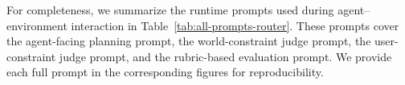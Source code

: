 \documentclass{llmxive}
\providecommand{\bench}[1]{AdaPlanBench}
\begin{document}
For completeness, we summarize the runtime prompts used during agent--environment
interaction in Table~\ref{tab:all-prompts-router}. These prompts cover the agent-facing
planning prompt, the world-constraint judge prompt, the user-constraint judge prompt,
and the rubric-based evaluation prompt. We provide each full prompt in the corresponding
figures for reproducibility.

\end{document}

